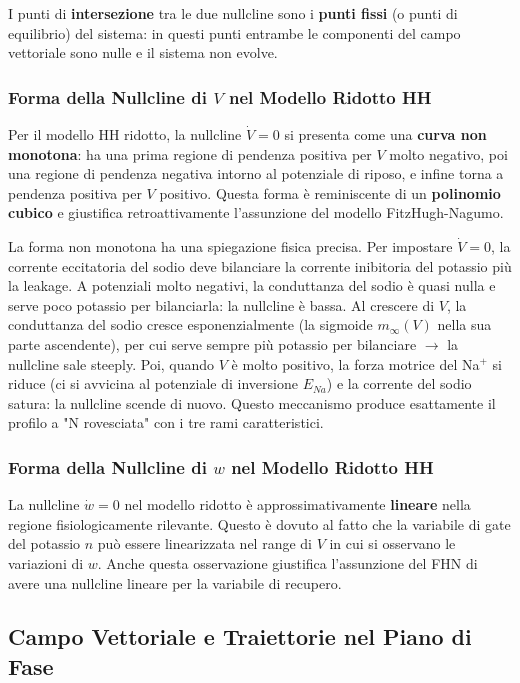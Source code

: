 I punti di \textbf{intersezione} tra le due nullcline sono i \textbf{punti fissi} (o punti di equilibrio) del sistema: in questi punti entrambe le componenti del campo vettoriale sono nulle e il sistema non evolve.

\subsubsection{Forma della Nullcline di $V$ nel Modello Ridotto HH}

Per il modello HH ridotto, la nullcline $\dot{V} = 0$ si presenta come una \textbf{curva non monotona}: ha una prima regione di pendenza positiva per $V$ molto negativo, poi una regione di pendenza negativa intorno al potenziale di riposo, e infine torna a pendenza positiva per $V$ positivo. Questa forma è reminiscente di un \textbf{polinomio cubico} e giustifica retroattivamente l'assunzione del modello FitzHugh-Nagumo.

La forma non monotona ha una spiegazione fisica precisa. Per impostare $\dot{V} = 0$, la corrente eccitatoria del sodio deve bilanciare la corrente inibitoria del potassio più la leakage. A potenziali molto negativi, la conduttanza del sodio è quasi nulla e serve poco potassio per bilanciarla: la nullcline è bassa. Al crescere di $V$, la conduttanza del sodio cresce esponenzialmente (la sigmoide $m_\infty(V)$ nella sua parte ascendente), per cui serve sempre più potassio per bilanciare $\rightarrow$ la nullcline sale steeply. Poi, quando $V$ è molto positivo, la forza motrice del Na$^+$ si riduce (ci si avvicina al potenziale di inversione $E_{Na}$) e la corrente del sodio satura: la nullcline scende di nuovo. Questo meccanismo produce esattamente il profilo a "N rovesciata" con i tre rami caratteristici.

\subsubsection{Forma della Nullcline di $w$ nel Modello Ridotto HH}

La nullcline $\dot{w} = 0$ nel modello ridotto è approssimativamente \textbf{lineare} nella regione fisiologicamente rilevante. Questo è dovuto al fatto che la variabile di gate del potassio $n$ può essere linearizzata nel range di $V$ in cui si osservano le variazioni di $w$. Anche questa osservazione giustifica l'assunzione del FHN di avere una nullcline lineare per la variabile di recupero.


\subsection{Campo Vettoriale e Traiettorie nel Piano di Fase}

